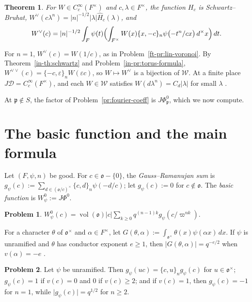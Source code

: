 \documentclass[reqno]{amsart}
\providecommand{\vol}{\operatorname{vol}}
\newcommand{\Dc}{\mathcal{D}}
\newcommand{\Wc}{\mathcal{W}}
\newcommand{\oo}{\mathfrak{o}}
\newcommand{\pp}{\mathfrak{p}}
\numberwithin{equation}{section}
\theoremstyle{definition}
\newtheorem{problem}{Problem}[section]
\theoremstyle{plain}
\newtheorem{theorem}{Theorem}[section]
\begin{document}
\begin{theorem}\label{th:transform}
  For $W \in C_c^\infty(F^\times)$ and $c, \lambda \in F^\times$, the function $H_c$ is Schwartz--Bruhat, $W^\vee(c \lambda^n) = \lvert n \rvert^{-1/2} \lvert \lambda \rvert \hat{H}_c(\lambda)$, and
  \begin{equation*}
    W^\vee(c) = \lvert n \rvert^{-1/2} \int_F \psi(t) \Bigl( \int_{F^\times} W(x) \{x, -c\}_n \psi\bigl(- t^n / c x\bigr) \, d^\times x \Bigr) \, d t.
  \end{equation*}
\end{theorem}

For $n = 1$, $W^\vee(c) = W(1/c)$, as in Problem~\ref{ft-pr:lin-voronoi}.  By Theorem~\ref{in-th:schwartz} and Problem~\ref{in-pr:torus-formula}, $W^{\vee \vee}(c) = \{-c, \varepsilon\}_n W(\varepsilon c)$, so $W \mapsto W^\vee$ is a bijection of $\Wc$.  At a finite place $J \Dc = C_c^\infty(F^\times)$, and each $W \in \Wc$ satisfies $W(d \lambda^n) = C_d \lvert \lambda \rvert$ for small $\lambda$ \cite[Lemma~10.11]{N}.

At $\pp \notin S$, the factor of Problem~\ref{pr:fourier-coeff} is $J \Phi_\pp^0$, which we now compute.

\section{The basic function and the main formula}\label{sec:main}

Let $(F, \psi, n)$ be good.  For $c \in \oo - \{0\}$, the \emph{Gauss--Ramanujan sum} is $g_\psi(c) := \sum_{d \in (\oo / c)^\times} \{c, d\}_n \psi(- d / c)$; let $g_\psi(c) := 0$ for $c \notin \oo$.  The \emph{basic function} is $W_\psi^0 := J \Phi^0$.

\begin{problem}\label{pr:gr-sums}
  $W_\psi^0(c) = \vol(\oo) \lvert c \rvert \sum_{k \geq 0} q^{(n-1) k} g_\psi(c / \varpi^{n k})$.
\end{problem}

For a character $\theta$ of $\oo^\times$ and $\alpha \in F^\times$, let $G(\theta, \alpha) := \int_{\oo^\times} \theta(x) \psi(\alpha x) \, d x$.  If $\psi$ is unramified and $\theta$ has conductor exponent $e \geq 1$, then $\lvert G(\theta, \alpha) \rvert = q^{-e/2}$ when $v(\alpha) = -e$ \cite[\S23.6, (23.6.3)]{BH}.

\begin{problem}\label{pr:gr-values}
  Let $\psi$ be unramified.  Then $g_\psi(u c) = \{c, u\}_n g_\psi(c)$ for $u \in \oo^\times$; $g_\psi(c) = 1$ if $v(c) = 0$ and $0$ if $v(c) \geq 2$; and if $v(c) = 1$, then $g_\psi(c) = -1$ for $n = 1$, while $\lvert g_\psi(c) \rvert = q^{1/2}$ for $n \geq 2$.
\end{problem}
\end{document}
